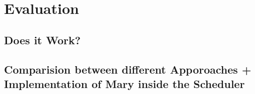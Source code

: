 \chapter{Evaluation}
\section{Does it Work?}

\section{Comparision between different Apporoaches + Implementation of Mary inside the Scheduler}